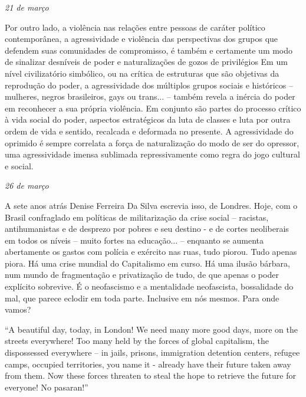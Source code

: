 \begin{flushright}
\emph{21 de março}
\end{flushright}

Por outro lado, a violência nas relações entre pessoas de caráter
político contemporânea, a agressividade e violência das perspectivas dos
grupos que defendem suas comunidades de compromisso, é também e
certamente um modo de sinalizar desníveis de poder e naturalizações de
gozos de privilégios Em um nível civilizatório simbólico, ou na crítica
de estruturas que são objetivas da reprodução do poder, a agressividade
dos múltiplos grupos sociais e históricos -- mulheres, negros
brasileiros, gays ou trans... -- também revela a inércia do poder em
reconhecer a sua própria violência. Em conjunto são partes do processo
crítico à vida social do poder, aspectos estratégicos da luta de classes
e luta por outra ordem de vida e sentido, recalcada e deformada no
presente. A agressividade do oprimido é sempre correlata a força de
naturalização do modo de ser do opressor, uma agressividade imensa
sublimada repressivamente como regra do jogo cultural e social.

\pagebreak

\begin{flushright}
\emph{26 de março}
\end{flushright}

A sete anos atrás Denise Ferreira Da Silva escrevia isso, de Londres.
Hoje, com o Brasil confraglado em políticas de militarização da crise
social -- racistas, antihumanistas e de desprezo por pobres e seu destino
- e de cortes neoliberais em todos os níveis -- muito fortes na
educação... -- enquanto se aumenta abertamente os gastos com polícia e
exército nas ruas, tudo piorou. Tudo apenas piora. Há uma crise mundial
do Capitalismo em curso. Há uma ilusão bárbara, num mundo de
fragmentação e privatização de tudo, de que apenas o poder explícito
sobrevive. É o neofascismo e a mentalidade neofascista, bossalidade do
mal, que parece eclodir em toda parte. Inclusive em nós mesmos. Para
onde vamos?

``A beautiful day, today, in London! We need many more good days, more
on the streets everywhere! Too many held by the forces of global
capitalism, the dispossessed everywhere -- in jails, prisons, immigration
detention centers, refugee camps, occupied territories, you name it -
already have their future taken away from them. Now these forces
threaten to steal the hope to retrieve the future for everyone! No
pasaran!''

